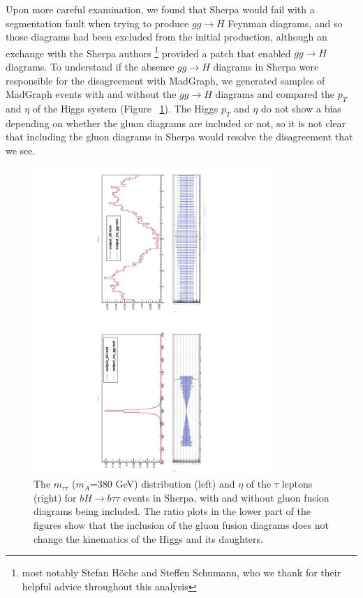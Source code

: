 Upon more careful examination, we found that Sherpa would fail with a segmentation fault
when trying to produce 
$gg\rightarrow H$ Feynman diagrams, and so those diagrams had been excluded from
the initial production, although
an exchange with the Sherpa authors \footnote{most notably Stefan H\"{o}che and Steffen 
Schumann, who we thank for their helpful advice throughout this analysis} provided 
a patch that enabled $gg\rightarrow H$ diagrams.  To understand
if the absence $gg\rightarrow H$ diagrams in Sherpa were responsible for the disagreement
with MadGraph, we generated samples of MadGraph events with and without the $gg\rightarrow H$
diagrams and compared the $p_T$ and $\eta$ of the Higgs system (Figure ~\ref{fig:ggH}).
The Higgs $p_T$ and $\eta$ do not show a bias depending on whether the gluon diagrams
are included or not, so it is not clear that including the gluon diagrams in Sherpa would
resolve the disagreement that we see. 

\begin{figure}
  \center
  \includegraphics[width=0.8\textwidth, angle=270]{MonteCarlo/figures/ggH.pdf}
  \caption{The $m_{\tau\tau}$ ($m_A$=380 GeV) distribution (left) and $\eta$ of the $\tau$ leptons (right)
  for $bH\rightarrow b\tau\tau$ events in Sherpa,
  with and without gluon fusion diagrams being included.  The ratio plots in the lower part of the
  figures show that the inclusion of the gluon fusion diagrams does not change the kinematics of the
  Higgs and its daughters. 
  \label{fig:ggH}}
\end{figure}

